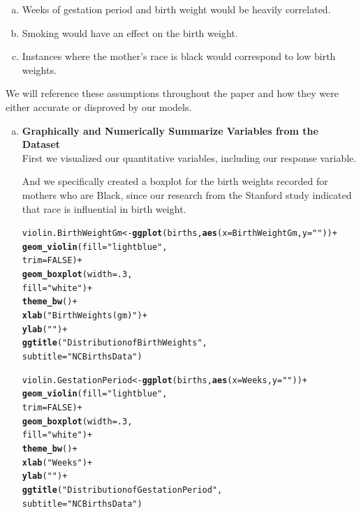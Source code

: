 \documentclass{article}\usepackage[]{graphicx}\usepackage[]{xcolor}
\makeatletter
\newcommand{\hlnum}[1]{\textcolor[rgb]{0.686,0.059,0.569}{#1}}%
\newcommand{\hlstr}[1]{\textcolor[rgb]{0.192,0.494,0.8}{#1}}%
\newcommand{\hlopt}[1]{\textcolor[rgb]{0,0,0}{#1}}%
\newcommand{\hlstd}[1]{\textcolor[rgb]{0.345,0.345,0.345}{#1}}%
\newcommand{\hlkwb}[1]{\textcolor[rgb]{0.69,0.353,0.396}{#1}}%
\newcommand{\hlkwc}[1]{\textcolor[rgb]{0.333,0.667,0.333}{#1}}%
\newcommand{\hlkwd}[1]{\textcolor[rgb]{0.737,0.353,0.396}{\textbf{#1}}}%
\newenvironment{kframe}{%
 \def\at@end@of@kframe{}%
 \ifinner\ifhmode%
  \def\at@end@of@kframe{\end{minipage}}%
  \begin{minipage}{\columnwidth}%
 \fi\fi%
 \def\FrameCommand##1{\hskip\@totalleftmargin \hskip-\fboxsep
 \colorbox{shadecolor}{##1}\hskip-\fboxsep
     \hskip-\linewidth \hskip-\@totalleftmargin \hskip\columnwidth}%
 \MakeFramed {\advance\hsize-\width
   \@totalleftmargin\z@ \linewidth\hsize
   \@setminipage}}%
 {\par\unskip\endMakeFramed%
 \at@end@of@kframe}
\newenvironment{knitrout}{}{} %
\makeatother
\begin{document}
\begin{enumerate}[a.] %
\item Weeks of gestation period and birth weight would be heavily correlated.
\item Smoking would have an effect on the birth weight. 
\item Instances where the mother's race is black would correspond to low birth weights. 
\end{enumerate} %

We will reference these assumptions throughout the paper and how they were either accurate or disproved by our models. \\

\begin{enumerate}[a.] %

\item \textbf{Graphically and Numerically Summarize Variables from the Dataset} \\

First we visualized our quantitative variables, including our response variable. 

And we specifically created a boxplot for the birth weights recorded for mothers who are Black, since our research from the Stanford study indicated that race is influential in birth weight.

\begin{knitrout}
\color{fgcolor}\begin{kframe}
\begin{alltt}
\hlstd{violin.BirthWeightGm} \hlkwb{<-} \hlkwd{ggplot}\hlstd{(births,} \hlkwd{aes}\hlstd{(}\hlkwc{x}\hlstd{=BirthWeightGm,} \hlkwc{y}\hlstd{=}\hlstr{""}\hlstd{))}\hlopt{+}
  \hlkwd{geom_violin}\hlstd{(}\hlkwc{fill} \hlstd{=} \hlstr{"lightblue"}\hlstd{,}
              \hlkwc{trim} \hlstd{=} \hlnum{FALSE}\hlstd{)}\hlopt{+}
  \hlkwd{geom_boxplot}\hlstd{(}\hlkwc{width} \hlstd{=} \hlnum{.3}\hlstd{,}
               \hlkwc{fill} \hlstd{=} \hlstr{"white"}\hlstd{)} \hlopt{+}
  \hlkwd{theme_bw}\hlstd{()}\hlopt{+}
  \hlkwd{xlab}\hlstd{(}\hlstr{"Birth Weights(gm)"}\hlstd{)}\hlopt{+}
  \hlkwd{ylab}\hlstd{(}\hlstr{" "}\hlstd{)}\hlopt{+}
  \hlkwd{ggtitle}\hlstd{(}\hlstr{"Distribution of Birth Weights"}\hlstd{,}
          \hlkwc{subtitle} \hlstd{=} \hlstr{"NCBirths Data"}\hlstd{)}


\hlstd{violin.GestationPeriod} \hlkwb{<-} \hlkwd{ggplot}\hlstd{(births,} \hlkwd{aes}\hlstd{(}\hlkwc{x}\hlstd{=Weeks,} \hlkwc{y}\hlstd{=}\hlstr{""}\hlstd{))}\hlopt{+}
  \hlkwd{geom_violin}\hlstd{(}\hlkwc{fill} \hlstd{=} \hlstr{"lightblue"}\hlstd{,}
              \hlkwc{trim} \hlstd{=} \hlnum{FALSE}\hlstd{)}\hlopt{+}
  \hlkwd{geom_boxplot}\hlstd{(}\hlkwc{width} \hlstd{=} \hlnum{.3}\hlstd{,}
               \hlkwc{fill} \hlstd{=} \hlstr{"white"}\hlstd{)} \hlopt{+}
  \hlkwd{theme_bw}\hlstd{()}\hlopt{+}
  \hlkwd{xlab}\hlstd{(}\hlstr{"Weeks"}\hlstd{)}\hlopt{+}
  \hlkwd{ylab}\hlstd{(}\hlstr{" "}\hlstd{)}\hlopt{+}
  \hlkwd{ggtitle}\hlstd{(}\hlstr{"Distribution of Gestation Period"}\hlstd{,}
          \hlkwc{subtitle} \hlstd{=} \hlstr{"NCBirths Data"}\hlstd{)}



\end{alltt}
\end{kframe}
\end{knitrout}
\end{enumerate}
\end{document}
